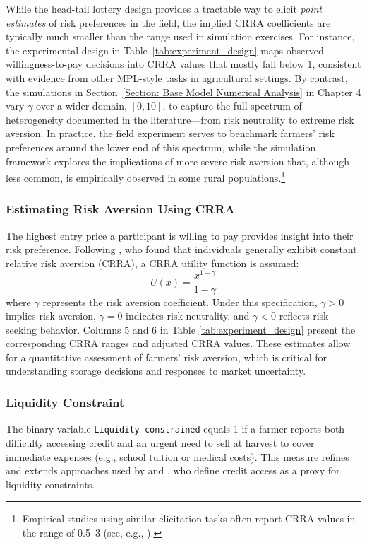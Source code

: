 While the head-tail lottery design provides a tractable way to elicit \textit{point estimates} of risk preferences in the field, the implied CRRA coefficients are typically much smaller than the range used in simulation exercises. For instance, the experimental design in Table~\ref{tab:experiment_design} maps observed willingness-to-pay decisions into CRRA values that mostly fall below 1, consistent with evidence from other MPL-style tasks in agricultural settings. By contrast, the simulations in Section~\ref{Section: Base Model Numerical Analysis} in Chapter 4 vary $\gamma$ over a wider domain, $[0,10]$, to capture the full spectrum of heterogeneity documented in the literature---from risk neutrality to extreme risk aversion. In practice, the field experiment serves to benchmark farmers’ risk preferences around the lower end of this spectrum, while the simulation framework explores the implications of more severe risk aversion that, although less common, is empirically observed in some rural populations.\footnote{Empirical studies using similar elicitation tasks often report CRRA values in the range of 0.5--3 (see, e.g., \cite{liu2013time}).}



\subsubsection{Estimating Risk Aversion Using CRRA}  
\noindent The highest entry price a participant is willing to pay provides insight into their risk preference. Following \cite{chiappori2011relative}, who found that individuals generally exhibit constant relative risk aversion (CRRA), a CRRA utility function is assumed:  
\[
U(x) = \frac{x^{1-\gamma}}{1 - \gamma}
\]  
where \( \gamma \) represents the risk aversion coefficient. Under this specification, \( \gamma > 0 \) implies risk aversion, \( \gamma = 0 \) indicates risk neutrality, and \( \gamma < 0 \) reflects risk-seeking behavior. Columns 5 and 6 in Table \ref{tab:experiment_design} present the corresponding CRRA ranges and adjusted CRRA values. These estimates allow for a quantitative assessment of farmers' risk aversion, which is critical for understanding storage decisions and responses to market uncertainty.  

\subsubsection{Liquidity Constraint}  
\noindent The binary variable \texttt{Liquidity constrained} equals 1 if a farmer reports both difficulty accessing credit and an urgent need to sell at harvest to cover immediate expenses (e.g., school tuition or medical costs). This measure refines and extends approaches used by \cite{albuquerque2024market} and \cite{stephens2011incomplete}, who define credit access as a proxy for liquidity constraints.  

